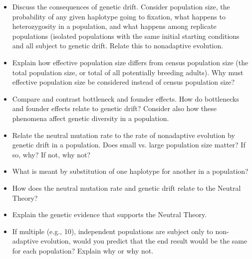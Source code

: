 \documentclass[letterpaper]{tufte-handout}
\begin{document}
\begin{itemize}
	\item Discuss the consequences of genetic drift.  Consider population size, the probability of any given haplotype going to fixation, what happens to heterozygosity in a population, and what happens among replicate populations (isolated populations with the same initial starting conditions and all subject to genetic drift.  Relate this to nonadaptive evolution.

	\item Explain how effective population size differs from census population size (the total population size, or total of all potentially breeding adults).  Why must effective population size be considered instead of census population size? 

	\item Compare and contrast bottleneck and founder effects. How do bottlenecks and founder effects relate to genetic drift?  Consider also how these phenomena affect genetic diversity in a population. 

	\item Relate the neutral mutation rate to the rate of nonadaptive evolution by genetic drift in a population.  Does small vs. large population size matter? If so, why?  If not, why not?

	\item What is meant by substitution of one haplotype for another in a population? 

	\item How does the neutral mutation rate and genetic drift relate to the Neutral Theory? 

	\item Explain the genetic evidence that supports the Neutral Theory.

	\item If multiple (e.g., 10), independent populations are subject only to non-adaptive evolution, would you predict that the end result would be the same for each population? Explain why or why not.
\end{itemize}
\end{document}
